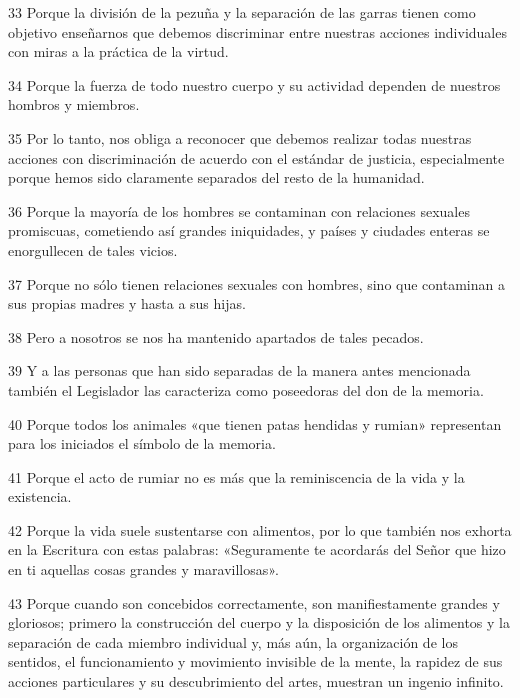\par 33 Porque la división de la pezuña y la separación de las garras tienen como objetivo enseñarnos que debemos discriminar entre nuestras acciones individuales con miras a la práctica de la virtud.

\par 34 Porque la fuerza de todo nuestro cuerpo y su actividad dependen de nuestros hombros y miembros.

\par 35 Por lo tanto, nos obliga a reconocer que debemos realizar todas nuestras acciones con discriminación de acuerdo con el estándar de justicia, especialmente porque hemos sido claramente separados del resto de la humanidad.

\par 36 Porque la mayoría de los hombres se contaminan con relaciones sexuales promiscuas, cometiendo así grandes iniquidades, y países y ciudades enteras se enorgullecen de tales vicios.

\par 37 Porque no sólo tienen relaciones sexuales con hombres, sino que contaminan a sus propias madres y hasta a sus hijas.

\par 38 Pero a nosotros se nos ha mantenido apartados de tales pecados.

\par 39 Y a las personas que han sido separadas de la manera antes mencionada también el Legislador las caracteriza como poseedoras del don de la memoria.

\par 40 Porque todos los animales «que tienen patas hendidas y rumian» representan para los iniciados el símbolo de la memoria.

\par 41 Porque el acto de rumiar no es más que la reminiscencia de la vida y la existencia.

\par 42 Porque la vida suele sustentarse con alimentos, por lo que también nos exhorta en la Escritura con estas palabras: «Seguramente te acordarás del Señor que hizo en ti aquellas cosas grandes y maravillosas».

\par 43 Porque cuando son concebidos correctamente, son manifiestamente grandes y gloriosos; primero la construcción del cuerpo y la disposición de los alimentos y la separación de cada miembro individual y, más aún, la organización de los sentidos, el funcionamiento y movimiento invisible de la mente, la rapidez de sus acciones particulares y su descubrimiento del artes, muestran un ingenio infinito.

